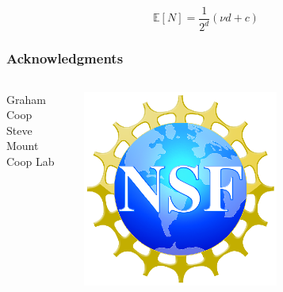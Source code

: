 \documentclass[hyperref={colorlinks = true,
                         urlcolor = blue,
                         linkcolor = blue}]{beamer}
\newcommand{\E}{\mathbb{E}}
\begin{document}
\begin{frame}
  \frametitle{}
  \begin{equation}
    \E[N] = \frac{1}{2^d} (\nu d + c)
  \end{equation}
\end{frame}


\begin{frame}
  \frametitle{Acknowledgments}
  \begin{columns}[c]
    \begin{column}{0.7\textwidth}
      Graham Coop\\
      Steve Mount\\[2em]
      Coop Lab
    \end{column} 
    \begin{column}{0.3\textwidth}
      \includegraphics[width=0.6\textwidth]{fig/nsf}
    \end{column} 
  \end{columns} 
\end{frame}
\end{document}

